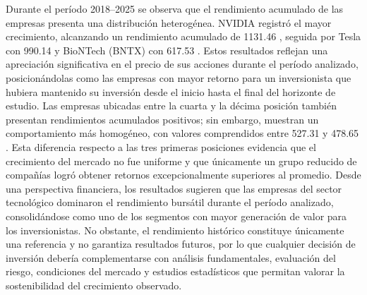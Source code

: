 Durante el período 2018–2025 se observa que el rendimiento acumulado de las empresas presenta una distribución heterogénea. NVIDIA registró el mayor crecimiento, alcanzando un rendimiento acumulado de
1131.46%
, seguida por Tesla con
990.14%
y BioNTech (BNTX) con
617.53%
. Estos resultados reflejan una apreciación significativa en el precio de sus acciones durante el período analizado, posicionándolas como las empresas con mayor retorno para un inversionista que hubiera mantenido su inversión desde el inicio hasta el final del horizonte de estudio.
Las empresas ubicadas entre la cuarta y la décima posición también presentan rendimientos acumulados positivos; sin embargo, muestran un comportamiento más homogéneo, con valores comprendidos entre
527.31%
y
478.65%
. Esta diferencia respecto a las tres primeras posiciones evidencia que el crecimiento del mercado no fue uniforme y que únicamente un grupo reducido de compañías logró obtener retornos excepcionalmente superiores al promedio.
Desde una perspectiva financiera, los resultados sugieren que las empresas del sector tecnológico dominaron el rendimiento bursátil durante el período analizado, consolidándose como uno de los segmentos con mayor generación de valor para los inversionistas. No obstante, el rendimiento histórico constituye únicamente una referencia y no garantiza resultados futuros, por lo que cualquier decisión de inversión debería complementarse con análisis fundamentales, evaluación del riesgo, condiciones del mercado y estudios estadísticos que permitan valorar la sostenibilidad del crecimiento observado.